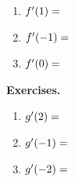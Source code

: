 \documentclass[10pt]{article}
\begin{document}
{\begin{enumerate}
    \item[(a)] $f'(1)=\dotfill$  
\vs{\vsp}
    \item[(b)] $f'(-1)=\dotfill$  
\vs{\vsp}
    \item[(c)] $f'(0)=\dotfill$  
\vs{\vsp}
    \end{enumerate}
}{
    {\bf\color{blue}Exercises.}
    \begin{enumerate}
    \item[(a)] $g'(2)=\dotfill$  
\vs{\vsp}
    \item[(b)] $g'(-1)=\dotfill$  
\vs{\vsp}
    \item[(c)] $g'(-2)=\dotfill$  
\vs{\vsp}
    \end{enumerate}
}
\end{document}

